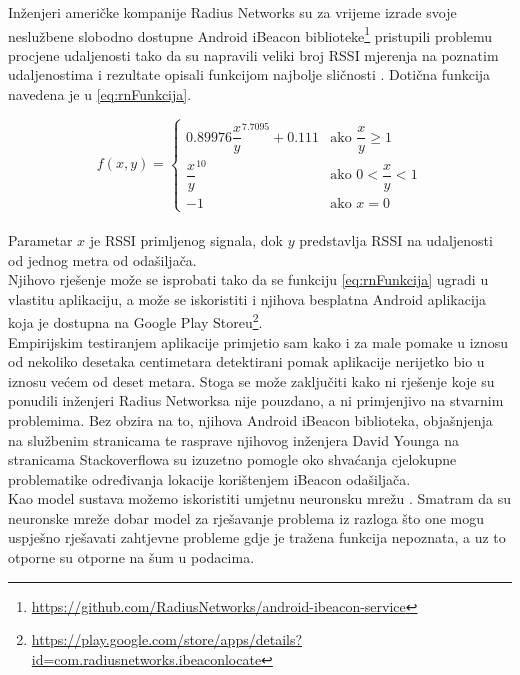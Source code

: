 Inženjeri američke kompanije Radius Networks su za vrijeme izrade svoje neslužbene slobodno dostupne Android iBeacon biblioteke\footnote{\url{https://github.com/RadiusNetworks/android-ibeacon-service}} pristupili problemu procjene udaljenosti tako da su napravili veliki broj RSSI mjerenja na poznatim udaljenostima i rezultate opisali funkcijom najbolje sličnosti \citep{stackoverflowRadiusDistancing}. 
Dotična funkcija navedena je u \eqref{eq:rnFunkcija}.

\begin{equation}
	\label{eq:rnFunkcija}
	f(x,y) = 
	\begin{cases}	
	0.89976 {\dfrac{x}{y}}^{7.7095} + 0.111 & \text{ako } \dfrac{x}{y} \geq 1 \\
	{\dfrac{x}{y}}^{10} & \text{ako } 0 < \dfrac{x}{y} < 1 \\
	-1 & \text{ako } x = 0 	
	\end{cases}
\end{equation}
\\

Parametar $x$ je RSSI primljenog signala, dok $y$ predstavlja RSSI na udaljenosti od jednog metra od odašiljača. 
\\

Njihovo rješenje može se isprobati tako da se funkciju \eqref{eq:rnFunkcija} ugradi u vlastitu aplikaciju, a može se iskoristiti i njihova besplatna Android aplikacija koja je dostupna na Google Play Storeu\footnote{\url{https://play.google.com/store/apps/details?id=com.radiusnetworks.ibeaconlocate}}.
\\
Empirijskim testiranjem aplikacije primjetio sam kako i za male pomake u iznosu od nekoliko desetaka centimetara detektirani pomak aplikacije nerijetko bio u iznosu većem od deset metara. 
Stoga se može zaključiti kako ni rješenje koje su ponudili inženjeri Radius Networksa nije pouzdano, a ni primjenjivo na stvarnim problemima. 
Bez obzira na to, njihova Android iBeacon biblioteka, objašnjenja na službenim stranicama te rasprave njihovog inženjera David Younga na stranicama Stackoverflowa su izuzetno pomogle oko shvaćanja cjelokupne problematike određivanja lokacije korištenjem iBeacon odašiljača.
\\

Kao model sustava možemo iskoristiti umjetnu neuronsku mrežu .  
Smatram da su neuronske mreže dobar model za rješavanje problema iz razloga što one mogu uspješno rješavati zahtjevne probleme gdje je tražena funkcija nepoznata, a uz to otporne su otporne na šum u podacima. 

